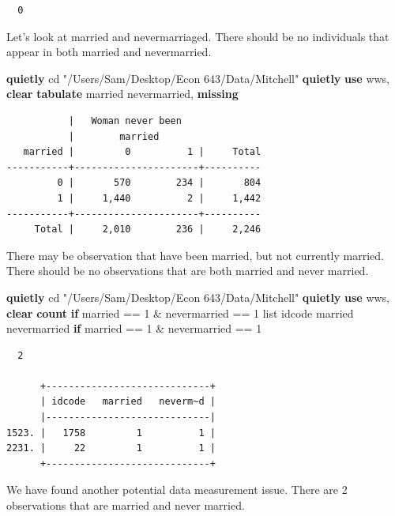\documentclass[
]{book}
\newenvironment{Shaded}{\begin{snugshade}}{\end{snugshade}}
\newcommand{\FunctionTok}[1]{\textcolor[rgb]{0.13,0.29,0.53}{\textbf{#1}}}
\newcommand{\KeywordTok}[1]{\textcolor[rgb]{0.13,0.29,0.53}{\textbf{#1}}}
\newcommand{\NormalTok}[1]{#1}
\newcommand{\OtherTok}[1]{\textcolor[rgb]{0.56,0.35,0.01}{#1}}
\newcommand{\StringTok}[1]{\textcolor[rgb]{0.31,0.60,0.02}{#1}}
\begin{document}
\begin{verbatim}
  0
\end{verbatim}

Let's look at married and nevermarriaged. There should be no individuals that appear in both married and nevermarried.

\begin{Shaded}
\begin{Highlighting}[]
\KeywordTok{quietly}\NormalTok{ cd }\StringTok{"/Users/Sam/Desktop/Econ 643/Data/Mitchell"}
\KeywordTok{quietly} \KeywordTok{use}\NormalTok{ wws, }\KeywordTok{clear}
\KeywordTok{tabulate}\NormalTok{ married nevermarried, }\FunctionTok{missing}
\end{Highlighting}
\end{Shaded}

\begin{verbatim}
           |   Woman never been
           |        married
   married |         0          1 |     Total
-----------+----------------------+----------
         0 |       570        234 |       804 
         1 |     1,440          2 |     1,442 
-----------+----------------------+----------
     Total |     2,010        236 |     2,246 
\end{verbatim}

There may be observation that have been married, but not currently married. There should be no observations that are both married and never married.

\begin{Shaded}
\begin{Highlighting}[]
\KeywordTok{quietly}\NormalTok{ cd }\StringTok{"/Users/Sam/Desktop/Econ 643/Data/Mitchell"}
\KeywordTok{quietly} \KeywordTok{use}\NormalTok{ wws, }\KeywordTok{clear}
\FunctionTok{count} \KeywordTok{if}\NormalTok{ married == 1 \& nevermarried == 1}
\OtherTok{list}\NormalTok{ idcode married nevermarried }\KeywordTok{if}\NormalTok{ married == 1 \& nevermarried == 1}
\end{Highlighting}
\end{Shaded}

\begin{verbatim}
  2

      +-----------------------------+
      | idcode   married   neverm~d |
      |-----------------------------|
1523. |   1758         1          1 |
2231. |     22         1          1 |
      +-----------------------------+
\end{verbatim}

We have found another potential data measurement issue. There are 2 observations that are married and never married.
\end{document}
